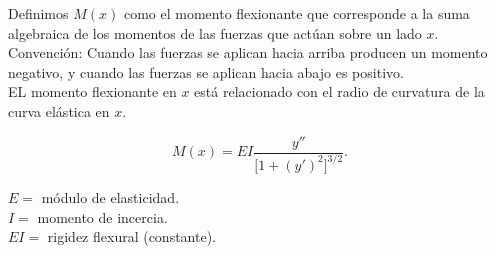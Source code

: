 \documentclass{beamer}
\begin{document}
\begin{frame}[t]
	\begin{block}{}
		Definimos \(M(x)\) como el momento flexionante que corresponde a  la suma algebraica de los momentos de las fuerzas que actúan sobre un lado \(x\). Convención: Cuando las fuerzas se aplican hacia arriba producen un momento negativo, y cuando las fuerzas se aplican hacia abajo es positivo. \\[2mm]
		EL momento flexionante en \(x\) está relacionado con el radio de curvatura de la curva elástica en \(x\).\\
		\begin{minipage}{0.5\linewidth}
			\[
				M(x) = EI \dfrac{y''}{\big[1+(y') ^2\big] ^{3/2}}.
			\]
		\end{minipage}\hspace{5mm}
		\begin{minipage}{0.4\linewidth}
			\(E=\) módulo de elasticidad. \\
			\(I=\) momento de incercia.\\
			\(EI=\) rigidez flexural (constante).
		\end{minipage}
	\end{block}
\end{frame}
\end{document}
